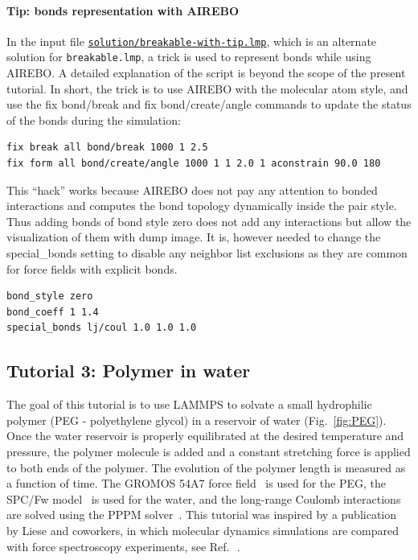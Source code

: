 \documentclass[9pt,tutorial]{livecoms}
\newcommand{\lmpcmd}[1]{\hspace{0pt}\colorbox{listing}{\textcolor{command}{\small{#1}}}\hspace{0pt}} %
\newcommand{\flecmd}[1]{\textcolor{command}{\texttt{#1}}} %
\newcommand{\dwlcmd}[1]{\textcolor{download}{\texttt{#1}}} %
\newcommand{\filepath}{https://raw.githubusercontent.com/lammpstutorials/lammpstutorials-article/main/files/}
\begin{document}
\paragraph{Tip: bonds representation with AIREBO}
\label{tip-dynamic-bonds}

In the input file
\href{\filepath tutorial2/solution/breakable-with-tip.lmp}{\dwlcmd{solution/breakable-with-tip.lmp}},
which is an alternate solution for \flecmd{breakable.lmp}, a trick is
used to represent bonds while using AIREBO.  A detailed explanation of
the script is beyond the scope of the present tutorial.  In short, the
trick is to use AIREBO with the \lmpcmd{molecular} atom style, and use
the \lmpcmd{fix bond/break} and \lmpcmd{fix bond/create/angle} commands
to update the status of the bonds during the simulation:
\begin{lstlisting}
fix break all bond/break 1000 1 2.5
fix form all bond/create/angle 1000 1 1 2.0 1 aconstrain 90.0 180
\end{lstlisting}

This ``hack'' works because AIREBO does not pay any attention to bonded
interactions and computes the bond topology dynamically inside the pair
style.  Thus adding bonds of bond style \lmpcmd{zero} does not add any
interactions but allow the visualization of them with \lmpcmd{dump
  image}.  It is, however needed to change the \lmpcmd{special\_bonds}
setting to disable any neighbor list exclusions as they are common for
force fields with explicit bonds.
\begin{lstlisting}
bond_style zero
bond_coeff 1 1.4
special_bonds lj/coul 1.0 1.0 1.0
\end{lstlisting}

\subsection{Tutorial 3: Polymer in water}
\label{all-atom-label}

The goal of this tutorial is to use LAMMPS to solvate a small
hydrophilic polymer (PEG - polyethylene glycol) in a reservoir of water
(Fig.~\ref{fig:PEG}).  Once the water reservoir is properly equilibrated
at the desired temperature and pressure, the polymer molecule is added
and a constant stretching force is applied to both ends of the polymer.
The evolution of the polymer length is measured as a function of time.
The {GROMOS} 54A7 force field~\cite{schmid2011definition} is used for the
PEG, the SPC/Fw model~\cite{wu2006flexible} is used for the water, and
the long-range Coulomb interactions are solved using the PPPM
solver~\cite{luty1996calculating}.  This tutorial was inspired by a
publication by Liese and coworkers, in which molecular dynamics
simulations are compared with force spectroscopy experiments, see
Ref.\,~.
\end{document}
